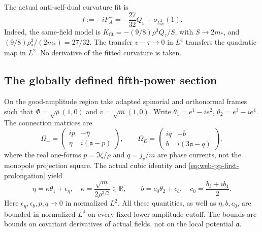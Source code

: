 The actual anti-self-dual curvature fit is
\begin{equation}
 f:=-iF_A^-=-\frac{27}{32}Q_v+o_{L^2_{\mathrm{av}}}(1).
 \label{eq:web-pp-curvature-fit}
\end{equation}
Indeed, the same-field model is
\(K_{\mathrm{fit}}=-(9/8)\rho^3Q_\tau/S\), with \(S\to2m_*\),
and \((9/8)\rho_*^3/(2m_*)=27/32\).  The transfer
\(v-\tau\to0\) in \(L^4\) transfers the quadratic map in \(L^2\).
No derivative of the fitted curvature is taken.

\subsection{The globally defined fifth-power section}

On the good-amplitude region take adapted spinorial and orthonormal frames
such that \(\Phi=\sqrt\rho(1,0)\) and \(v=\sqrt m(1,0)\).  Write
\(\theta_1=e^1-ie^2\), \(\theta_2=e^3-ie^4\).  The connection matrices are
\begin{equation}
 \Omega_+=\begin{pmatrix}ip&-\bar\eta\\\eta&i(\mathfrak a-p)\end{pmatrix},
 \qquad
 \Omega_E=\begin{pmatrix}iq&-\bar b\\b&i(3\mathfrak a-q)\end{pmatrix},
 \label{eq:web-pp-adapted-connections}
\end{equation}
where the real one-forms \(p=\Im\zeta/\rho\) and \(q=j_v/m\) are
phase currents, not the monopole projection square.  The actual cubic
identity and \eqref{eq:web-pp-first-prolongation} yield
\begin{equation}
 \eta=\kappa\theta_1+\epsilon_\eta,
 \quad\kappa=\frac{\sqrt m}{2\rho^{3/2}}\in\mathbb R,
 \qquad b=c_0\theta_2+\epsilon_b,
 \quad c_0=\frac{b_3+ib_4}{2}.
 \label{eq:web-pp-connection-errors}
\end{equation}
Here \(\epsilon_\eta,\epsilon_b,p,q\to0\) in normalized \(L^2\).
All these quantities, as well as \(\eta,b,c_0\), are bounded in normalized
\(L^4\) on every fixed lower-amplitude cutoff.  The bounds are bounds on
covariant derivatives of actual fields, not on the local potential
\(\mathfrak a\).

